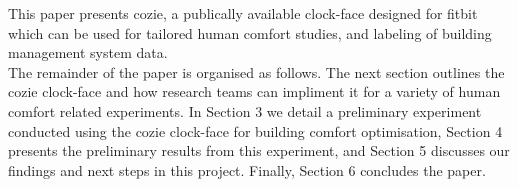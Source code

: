 This paper presents cozie, a publically available clock-face designed for fitbit which can be used for tailored human comfort studies, and labeling of building management system data. \\

The remainder of the paper is organised as follows. The next section outlines the cozie clock-face and how research teams can impliment it for a variety of human comfort related experiments. In Section 3 we detail a preliminary experiment conducted using the cozie clock-face for building comfort optimisation, Section 4 presents the preliminary results from this experiment, and Section 5 discusses our findings and next steps in this project. Finally, Section 6 concludes the paper. 
















